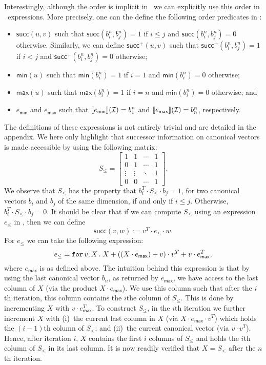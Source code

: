 Interestingly, although the order is implicit in \langfor\, we can explicitly use this order in \langfor\ expressions. More precisely, one can the define the following order predicates in \langfor:
\begin{itemize}
	\item $\mathsf{succ}(u,v)$ such that $\mathsf{succ}(b_i^n,b_j^n)=1$ if $i\leq j$ and $\mathsf{succ}(b_i^n,b_j^n)=0$ otherwise. Similarly, we can define
	$\mathsf{succ}^+(u,v)$ such that  $\mathsf{succ}^+(b_i^n,b_j^n)=1$ if $i < j$ and $\mathsf{succ}^+(b_i^n,b_j^n)=0$ otherwise;
	\item $\mathsf{min}(u)$ such that  $\mathsf{min}(b_i^n)=1$ if $i=1$ and $\mathsf{min}(b_i^n)=0$ otherwise; 
	\item $\mathsf{max}(u)$ such that  $\mathsf{max}(b_i^n)=1$ if $i=n$ and $\mathsf{min}(b_i^n)=0$ otherwise; and
	\item $e_{\mathsf{min}}$ and $e_{\mathsf{max}}$ such that $\llbracket e_{\mathsf{min}} \rrbracket(\mathcal{I})=b_1^n$ and 
	$\llbracket e_{\mathsf{max}} \rrbracket(\mathcal{I})=b_n^n$, respectively.
	\end{itemize}
The definitions of these expressions is not entirely trivial and are detailed in the appendix.
We here only highlight that successor information on canonical vectors is made accessible by
using the following matrix:
%
\[
S_{\leq} = \begin{bmatrix}
    1 & 1 & \cdots &  1 \\
    0 & 1 & \cdots & 1\\
    \vdots & \vdots & \ddots & 1 \\
    0 & 0 & \cdots & 1 
\end{bmatrix}.
\] 
We observe that $S_{\leq}$ has the property that $b_i^T\cdot S_{\leq} \cdot b_j=1$, for two canonical vectors $b_i$ and $b_j$ of the same dimension, if and only if $i\leq j$. Otherwise, $b_i^T\cdot S_{\leq} \cdot b_j=0$. It should be clear that if we can compute $S_{\leq}$ using an expression $e_{\leq}$ in \langfor, then we can define
$$
\mathsf{succ}(v,w):=v^T\cdot e_{\leq} \cdot w.
$$
For $e_{\leq}$ we can take the following \langfor expression:
$$
e_{\leq}=\texttt{for}\, v,X \texttt{.}\, X + \left((X\cdot e_{\mathsf{max}}) + v \right)\cdot v^T + v\cdot e^T_{\mathsf{max}},
$$
where $e_{\mathsf{max}}$ is as defined above. The intuition behind this expression is that by using the last canonical vector $b_n$, as returned by $e_{\mathsf{max}}$, we have access to the last column of $X$ (via the product $X\cdot e_{\mathsf{max}}$). We use this column such that after the $i$th iteration, this column contains the $i$the column of $S_{\leq}$. This is done by incrementing $X$ with $v\cdot e_{\mathsf{max}}^T$.
To construct $S_{\leq}$, in the $i$th iteration we further increment $X$ with 
(i)~the current last column in $X$ (via $X\cdot e_{\mathsf{max}}\cdot v^T$) which holds
the $(i-1)$th column of $S_{\leq}$; and (ii)~the current canonical vector (via $v\cdot v^T$). Hence, after iteration $i$, $X$ contains the first $i$ columns of $S_{\leq}$ and holds the $i$th column of $S_{\leq}$ in its last column. It is now readily verified that $X=S_{\leq}$ after the $n$th iteration.


